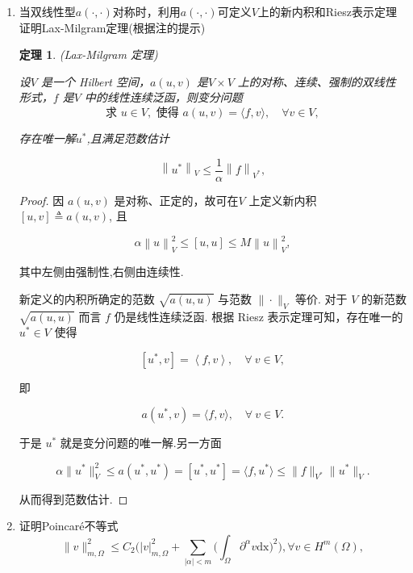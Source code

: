 \documentclass[12pt,a4paper]{article}
\newtheorem{theorem}{定理}
\begin{document}
\begin{enumerate}
\begin{proof}[解]
		\end{proof}
		
		\item 
		当双线性型$a(\cdot,\cdot)$对称时，利用$a(\cdot,\cdot)$可定义$V$上的新内积和Riesz表示定理证明Lax-Milgram定理(根据注的提示)
		
		\begin{theorem}(Lax-Milgram 定理)
			
			设$V$ 是一个 Hilbert 空间，$a(u,v)$ 是$V\times V$ 上的对称、连续、强制的双线性形式，$f$ 是$V$ 中的线性连续泛函，则变分问题
			$$\text{求 }u\in V,\text{ 使得 }a(u,v)=\langle f,v\rangle,\quad\forall v\in V,$$
			
			存在唯一解$u^*$,且满足范数估计
			
			$$
			\left\|u^*\right\|_V\leqslant\frac{1}{\alpha}\left\|f\right\|_{V^*},
			$$
			
		\end{theorem}
		
		\begin{proof}
			因 $a(u,v)$ 是对称、正定的，故可在$V$ 上定义新内积 $[u,v]\triangleq a(u,v)$, 且
			
			$$
			\alpha{\left\|u\right\|}_{V}^{2}\leqslant\left[u,u\right]\leqslant M{\left\|u\right\|}_{V}^{2},
			$$
			
			其中左侧由强制性,右侧由连续性.
			
			新定义的内积所确定的范数 $\sqrt{a(u,u)}$ 与范数 $\|\cdot\|_V$ 等价. 对于 $V$ 的新范数$\sqrt{a(u,u)}$ 而言 $f$ 仍是线性连续泛函. 根据 Riesz 表示定理可知，存在唯一的 $u^*\in V$ 使得
			
			$$
			[u^*,v]=\left\langle f,v\right\rangle,\quad\forall\:v\in V,
			$$
			
			即
			
			$$
			a(u^*,v)=\langle f,v\rangle,\quad\forall\:v\in V.
			$$
			
			于是 $u^*$ 就是变分问题的唯一解.另一方面
			
			$$
			\alpha\|u^*\|_V^2\leqslant a(u^*,u^*)=[u^*,u^*]=\langle f,u^*\rangle\leqslant\|f\|_{V^*}\|u^*\|_V.
			$$
			
			从而得到范数估计.
		\end{proof}
		
		\item 证明Poincaré不等式
		\begin{equation}
			\|v\|_{m,\Omega}^2\leq C_2\Big(|v|_{m,\Omega}^2+\sum_{|\alpha|<m}\Big(\int_\Omega\partial^\alpha v\mathrm{dx}\Big)^2\Big),\forall v\in H^m(\Omega),\label{poincare}
		\end{equation}
		

\end{enumerate}
\end{document}
